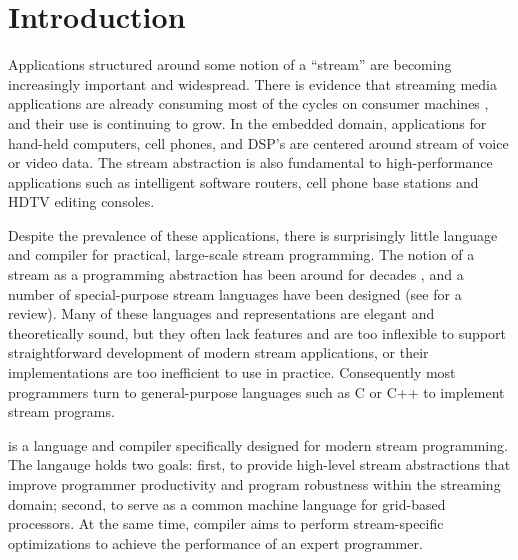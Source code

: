 \section{Introduction}

Applications structured around some notion of a ``stream'' are
becoming increasingly important and widespread. There is evidence
that streaming media applications are already consuming most of
the cycles on consumer machines \cite{Rix98}, and their use is
continuing to grow.  In the embedded domain, applications for
hand-held computers, cell phones, and DSP's are centered around
stream of voice or video data.  The stream abstraction is also
fundamental to high-performance applications such as intelligent
software routers, cell phone base stations and HDTV editing
consoles.

Despite the prevalence of these applications, there is
surprisingly little language and compiler for practical,
large-scale stream programming.  The notion of a stream as a
programming abstraction has been around for decades \cite{SICP},
and a number of special-purpose stream languages have been
designed (see \cite{survey97} for a review). Many of these
languages and representations are elegant and theoretically sound,
but they often lack features and are too inflexible to support
straightforward development of modern stream applications, or
their implementations are too inefficient to use in practice.
Consequently most programmers turn to general-purpose languages
such as C or C++ to implement stream programs.

\begin{comment}
There are two reasons that general-purpose languages are
inappropriate for stream programming.  Firstly, they are a
mismatch for the application domain.  That is they do not provide
a natural or intuitive representation of streams thereby having a
negative effect on readability, robustness, and programmer
productivity.  Furthermore, general-purpose languages do not
communicate well the inherent parallelism of stream computations.
 Secondly, general-purpose languages are a mismatch for the
emerging class of grid-based architectures
\cite{smartmemories,rawshort,trips}.
\end{comment}

{\StreamIt} is a language and compiler specifically designed for
modern stream programming.  The {\StreamIt} langauge holds two
goals: first, to provide high-level stream abstractions that
improve programmer productivity and program robustness within the
streaming domain; second, to serve as a common machine language
for grid-based processors.  At the same time, {\StreamIt} compiler
aims to perform stream-specific optimizations to achieve the
performance of an expert programmer.

